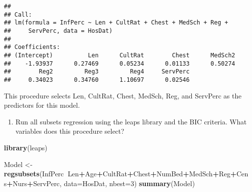 \documentclass[]{article}
\newenvironment{Shaded}{\begin{snugshade}}{\end{snugshade}}
\newcommand{\KeywordTok}[1]{\textcolor[rgb]{0.13,0.29,0.53}{\textbf{#1}}}
\newcommand{\DataTypeTok}[1]{\textcolor[rgb]{0.13,0.29,0.53}{#1}}
\newcommand{\DecValTok}[1]{\textcolor[rgb]{0.00,0.00,0.81}{#1}}
\newcommand{\StringTok}[1]{\textcolor[rgb]{0.31,0.60,0.02}{#1}}
\newcommand{\OperatorTok}[1]{\textcolor[rgb]{0.81,0.36,0.00}{\textbf{#1}}}
\newcommand{\NormalTok}[1]{#1}
\providecommand{\tightlist}{%
  \setlength{\itemsep}{0pt}\setlength{\parskip}{0pt}}
\begin{document}
\begin{verbatim}
## 
## Call:
## lm(formula = InfPerc ~ Len + CultRat + Chest + MedSch + Reg + 
##     ServPerc, data = HosDat)
## 
## Coefficients:
## (Intercept)          Len      CultRat        Chest      MedSch2  
##    -1.93937      0.27469      0.05234      0.01133      0.50274  
##        Reg2         Reg3         Reg4     ServPerc  
##     0.34023      0.34760      1.10697      0.02546
\end{verbatim}

This procedure selects Len, CultRat, Chest, MedSch, Reg, and ServPerc as
the predictors for this model.

\begin{enumerate}
\def\labelenumi{\Alph{enumi})}
\setcounter{enumi}{2}
\tightlist
\item
  Run all subsets regression using the leaps library and the BIC
  criteria. What variables does this procedure select?
\end{enumerate}

\begin{Shaded}
\begin{Highlighting}[]
\KeywordTok{library}\NormalTok{(leaps)}

\NormalTok{Model <-}\StringTok{ }\KeywordTok{regsubsets}\NormalTok{(InfPerc}\OperatorTok{~}\NormalTok{Len}\OperatorTok{+}\NormalTok{Age}\OperatorTok{+}\NormalTok{CultRat}\OperatorTok{+}\NormalTok{Chest}\OperatorTok{+}\NormalTok{NumBed}\OperatorTok{+}\NormalTok{MedSch}\OperatorTok{+}\NormalTok{Reg}\OperatorTok{+}\NormalTok{Cens}\OperatorTok{+}\NormalTok{Nurs}\OperatorTok{+}\NormalTok{ServPerc, }\DataTypeTok{data=}\NormalTok{HosDat, }\DataTypeTok{nbest=}\DecValTok{3}\NormalTok{)}
\KeywordTok{summary}\NormalTok{(Model)}
\end{Highlighting}
\end{Shaded}
\end{document}
